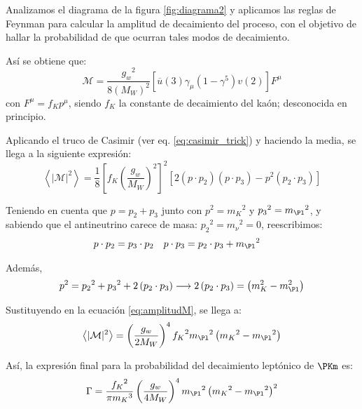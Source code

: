 Analizamos el diagrama de la figura \ref{fig:diagrama2} y aplicamos las reglas de Feynman para calcular la amplitud de decaimiento del proceso, con el objetivo de hallar la probabilidad de que ocurran tales modos de decaimiento. 

Así se obtiene que:
\begin{equation}
\mathcal{M} =\dfrac{{g_{w}}^2}{8\left( M_W\right)^{2}}\left[ \overline{u}\left(3\right) \gamma_{\mu}\left( 1-\gamma^{5} \right) v\left( 2\right) \right] F^{\mu}\label{eq:Msimple}
\end{equation}
con $F^{\mu}=f_K p^{\mu}$, siendo $f_K$ la constante de decaimiento del kaón; desconocida en principio.

Aplicando el truco de Casimir (ver eq. \ref{eq:casimir_trick}) y haciendo la media, se llega a la siguiente expresión:
\begin{equation}
\left\langle |\mathcal{M}|^{2}\right\rangle=\dfrac{1}{8}\left[ f_{K}\left( \dfrac{g_w}{M_W}\right) ^{2}\right] ^{2}\left[2\left( p\cdot p_{2}\right) \left( p\cdot p_{3}\right) -p^{2}\left( p_{2}\cdot p_{3}\right)\right]\label{eq:amplitudM}
\end{equation}

Teniendo en cuenta que $p=p_{2}+p_{3}$ junto con $p^2={m_K}^2$ y ${p_3}^2={m_{\Pl}}^2$, y sabiendo que el antineutrino carece de masa: ${p_2}^2={m_{\nu}}^2=0$, reescribimos:
\begin{align}
p\cdot p_{2} &= p_{3} \cdot p_{2} & p \cdot p_{3} &= p_{2} \cdot p_{3}+{m_{\Pl}}^2
\end{align}

Además,
\begin{equation}
p^{2}={p_{2}}^{2}+{p_3}^{2}+2\left( p_{2} \cdot p_{3}\right) \longrightarrow 2\left( p_{2} \cdot p_{3}\right)=\left( m_{K}^{2}-m_{\Pl}^{2}\right)
\end{equation}

Sustituyendo en la ecuación \ref{eq:amplitudM}, se llega a:
\begin{equation}
\left\langle |\mathcal{M}|^{2}\right\rangle=\left( \dfrac{g_w}{2M_W}\right)^{4} {f_K}^2 {m_{\Pl}}^{2}\left( {m_{K}}^{2}-{m_{\Pl}}^{2}\right)\label{eq:amplitudmedia}
\end{equation}

Así, la expresión final para la probabilidad del decaimiento leptónico de $\PKm$ es:
\begin{equation}
\Gamma =\dfrac{{f_{K}}^{2}}{\pi {m_{K}}^{3}}\left( \dfrac{g_w}{4M_W}\right)^{4}{m_{\Pl}}^{2}\left({m_{K}}^{2}-{m_{\Pl}}^{2}\right)^{2}\label{eq:decayrate}
\end{equation}

